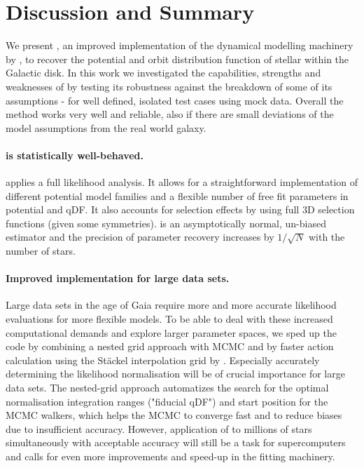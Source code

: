 \section{Discussion and Summary}

We present \RM, an improved implementation of the dynamical modelling machinery by \citet{bov13}, to recover the potential and orbit distribution function of stellar \MAPs within the Galactic disk. In this work we investigated the capabilities, strengths and weaknesses of \RM by testing its robustness against the breakdown of some of its assumptions - for well defined, isolated test cases using mock data. Overall the method works very well and reliable, also if there are small deviations of the model assumptions from the real world galaxy.

\paragraph{\RM is statistically well-behaved.} \RM applies a full likelihood analysis. It allows for a straightforward implementation of different potential model families and a flexible number of free fit parameters in potential and qDF. It also accounts for selection effects by using full 3D selection functions (given some symmetries). \RM is an asymptotically normal, un-biased estimator and the precision of parameter recovery increases by $1/\sqrt{N}$ with the number of stars.

\paragraph{Improved implementation for large data sets.} Large data sets in the age of Gaia require more and more accurate likelihood evaluations for more flexible models. To be able to deal with these increased computational demands and explore larger parameter spaces, we sped up the code by combining a nested grid approach with MCMC and by faster action calculation using the St\"{a}ckel \citep{bin12} interpolation grid by \citet{bov15}. Especially accurately determining the likelihood normalisation will be of crucial importance for large data sets. The nested-grid approach automatizes the search for the optimal normalisation integration ranges ("fiducial qDF") and start position for the MCMC walkers, which helps the MCMC to converge fast and to reduce biases due to insufficient accuracy. However, application of \RM to millions of stars simultaneously with acceptable accuracy will still be a task for supercomputers and calls for even more improvements and speed-up in the fitting machinery.


